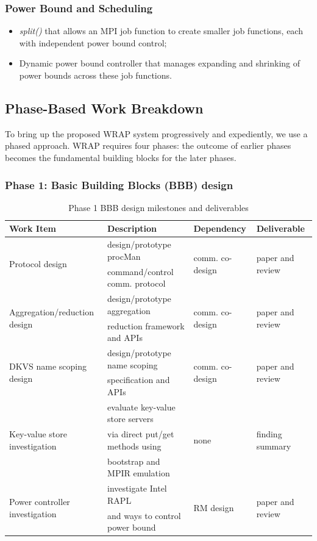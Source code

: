 \subsubsection{Power Bound and Scheduling}
\begin{itemize}
\item{{\em split()} that allows an MPI job function to create smaller job functions, each with independent power bound control;}
\item{Dynamic power bound controller that manages expanding and shrinking of power bounds across these job functions.}
\end{itemize}

\subsection{Phase-Based Work Breakdown}
To bring up the proposed WRAP system progressively and expediently, we use a phased approach.
WRAP requires four phases: the outcome of earlier phases becomes the fundamental 
building blocks for the later phases.

\subsubsection{Phase 1: Basic Building Blocks (BBB) design}

\begin{table}
\centering
\begin{tabular}{|l|l|l|l|}
\hline
Work Item & Description & Dependency & Deliverable \\
\hline
\multirow{2}{*}{Protocol design} & design/prototype procMan & \multirow{2}{*}{comm. co-design} & \multirow{2}{*}{paper and review} \\
& command/control comm. protocol & & \\ \hline
\multirow{2}{*}{Aggregation/reduction design} & design/prototype aggregation &  \multirow{2}{*}{comm. co-design} & \multirow{2}{*}{paper and review} \\
& reduction framework and APIs & & \\ \hline
\multirow{2}{*}{DKVS name scoping design} & design/prototype name scoping & \multirow{2}{*}{comm. co-design} & \multirow{2}{*}{paper and review} \\
& specification and APIs & & \\ \hline
\multirow{3}{*}{Key-value store investigation}& evaluate key-value store servers & \multirow{3}{*}{none} & \multirow{3}{*}{finding summary} \\
& via direct put/get methods using & & \\
& bootstrap and MPIR emulation& & \\ \hline
\multirow{2}{*}{Power controller investigation} & investigate Intel RAPL &  \multirow{2}{*}{RM design} & \multirow{2}{*}{paper and review} \\
& and ways to control power bound & & \\ \hline
\end{tabular}
\caption{Phase 1 BBB design milestones and deliverables}
\label{tab:phase1}
\end{table}

